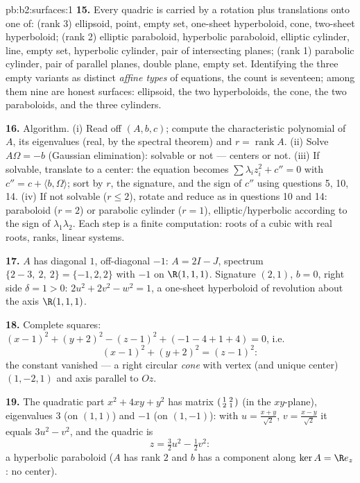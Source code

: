 \begin{solution}{pb:b2:surfaces:1}
\textbf{15.} Every quadric is carried by a rotation plus
translations onto one of: (rank 3) ellipsoid, point, empty
set, one-sheet hyperboloid, cone, two-sheet hyperboloid;
(rank 2) elliptic paraboloid, hyperbolic paraboloid, elliptic
cylinder, line, empty set, hyperbolic cylinder, pair of
intersecting planes; (rank 1) parabolic cylinder, pair of
parallel planes, double plane, empty set. Identifying the
three empty variants as distinct \emph{affine types} of
equations, the count is seventeen; among them nine are honest
surfaces: ellipsoid, the two hyperboloids, the cone, the two
paraboloids, and the three cylinders.

\textbf{16.} Algorithm. (i) Read off $(A, b, c)$; compute the
characteristic polynomial of $A$, its eigenvalues (real, by
the spectral theorem) and $r = \operatorname{rank}A$. (ii)
Solve $A\Omega = -b$ (Gaussian elimination): solvable or not
--- centers or not. (iii) If solvable, translate to a center:
the equation becomes $\sum\lambda_iz_i^2 + c'' = 0$ with $c''
= c + \langle b, \Omega\rangle$; sort by $r$, the signature,
and the sign of $c''$ using questions 5, 10, 14. (iv) If not
solvable ($r \leq 2$), rotate and reduce as in questions 10
and 14: paraboloid ($r = 2$) or parabolic cylinder ($r = 1$),
elliptic/hyperbolic according to the sign of
$\lambda_1\lambda_2$. Each step is a finite computation:
roots of a cubic with real roots, ranks, linear systems.

\textbf{17.} $A$ has diagonal $1$, off-diagonal $-1$: $A = 2I
- J$, spectrum $\{2 - 3,\ 2,\ 2\} = \{-1, 2, 2\}$ with $-1$
on $\R(1,1,1)$. Signature $(2,1)$, $b = 0$, right side
$\delta = 1 > 0$: $2u^2 + 2v^2 - w^2 = 1$, a one-sheet
hyperboloid of revolution about the axis $\R(1,1,1)$.

\textbf{18.} Complete squares: $(x-1)^2 + (y+2)^2 - (z-1)^2 +
(-1 - 4 + 1 + 4) = 0$, i.e.
\[
(x-1)^2 + (y+2)^2 = (z-1)^2 :
\]
the constant vanished --- a right circular \emph{cone} with
vertex (and unique center) $(1, -2, 1)$ and axis parallel to
$Oz$.

\textbf{19.} The quadratic part $x^2 + 4xy + y^2$ has matrix
$\begin{psmallmatrix}1 & 2\\ 2 & 1\end{psmallmatrix}$ (in the
$xy$-plane), eigenvalues $3$ (on $(1,1)$) and $-1$ (on
$(1,-1)$): with $u = \frac{x+y}{\sqrt2}$, $v =
\frac{x-y}{\sqrt2}$ it equals $3u^2 - v^2$, and the quadric
is
\[
z = \tfrac32u^2 - \tfrac12v^2 :
\]
a hyperbolic paraboloid ($A$ has rank $2$ and $b$ has a
component along $\ker A = \R e_z$: no center).


\end{solution}
